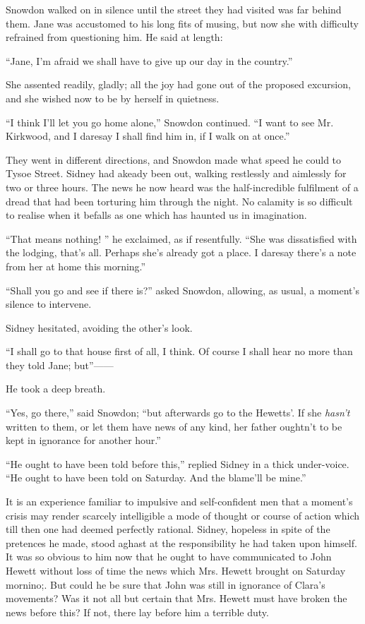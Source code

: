 Snowdon walked on in silence until the street they had visited was far
behind them. Jane was accustomed to his long fits of musing, but now she
with difficulty refrained from questioning him. He said at length:

``Jane, I'm afraid we shall have to give up our day in the country.''

She assented readily, gladly; all the joy had gone out of the proposed
excursion, and she wished now to be by herself in quietness.

``I think I'll let you go home alone,'' Snowdon continued. ``I want to
see Mr. {\protect\hypertarget{279}{}{}}Kirkwood, and I daresay I shall
find him in, if I walk on at once.''

They went in different directions, and Snowdon made what speed he could
to Tysoe Street. Sidney had akeady been out, walking restlessly and
aimlessly for two or three hours. The news he now heard was the
half-incredible fulfilment of a dread that had been torturing him
through the night. No calamity is so difficult to realise when it
befalls as one which has haunted us in imagination.

``That means nothing! '' he exclaimed, as if resentfully. ``She was
dissatisfied with the lodging, that's all. Perhaps she's already got a
place. I daresay there's a note from her at home this morning.''

``Shall you go and see if there is?'' asked Snowdon, allowing, as usual,
a moment's silence to intervene.

Sidney hesitated, avoiding the other's look.

``I shall go to that house first of all, I think. Of course I shall hear
no more than they told Jane; but''{{------}}

{\protect\hypertarget{280}{}{}}He took a deep breath.

``Yes, go there,'' said Snowdon; ``but afterwards go to the Hewetts'. If
she \emph{hasn't} written to them, or let them have news of any kind,
her father oughtn't to be kept in ignorance for another hour.''

``He ought to have been told before this,'' replied Sidney in a thick
under-voice. ``He ought to have been told on Saturday. And the blame'll
be mine.''

It is an experience familiar to impulsive and self-confident men that a
moment's crisis may render scarcely intelligible a mode of thought or
course of action which till then one had deemed perfectly rational.
Sidney, hopeless in spite of the pretences he made, stood aghast at the
responsibility he had taken upon himself. It was so obvious to him now
that he ought to have communicated to John Hewett without loss of time
the news which Mrs. Hewett brought on Saturday mornino;. But could he be
sure that John was still in ignorance of Clara's movements? Was it not
all but certain that Mrs. Hewett {\protect\hypertarget{281}{}{}}must
have broken the news before this? If not, there lay before him a
terrible duty.

